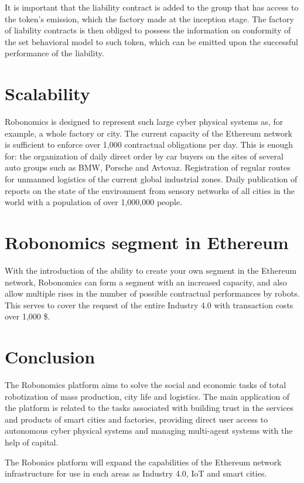 \documentclass{article}
\begin{document}
It is important that the liability contract is added to the group that has access to the token’s emission, which the factory made at the inception stage. The factory of liability contracts is then obliged to possess the information on conformity of the set behavioral model to such token, which can be emitted upon the successful performance of the liability.

\section{Scalability}

Robonomics is designed to represent such large cyber physical systems as, for example, a whole factory or city. The current capacity of the Ethereum network is sufficient to enforce over 1,000 contractual obligations per day. This is enough for:
the organization of daily direct order by car buyers on the sites of several auto groups such as BMW, Porsche and Avtovaz.
Registration of regular routes for unmanned logistics of the current global industrial zones.
Daily publication of reports on the state of the environment from sensory networks of all cities in the world with a population of over 1,000,000 people.

\section{Robonomics segment in Ethereum}

With the introduction of the ability to create your own segment in the Ethereum network, Robonomics can form a segment with an increased capacity, and also allow multiple rises in the number of possible contractual performances by robots. This serves to cover the request of the entire Industry 4.0 with transaction costs over 1,000 \$.

\section{Conclusion}

The Robonomics platform aims to solve the social and economic tasks of total robotization of mass production, city life and logistics. The main application of the platform is related to the tasks associated with building trust in the services and products of smart cities and factories, providing direct user access to autonomous cyber physical systems and managing multi-agent systems with the help of capital.

The Robonics platform will expand the capabilities of the Ethereum network infrastructure for use in such areas as Industry 4.0, IoT and smart cities.
\newpage
\printbibliography
\newpage
\end{document}
